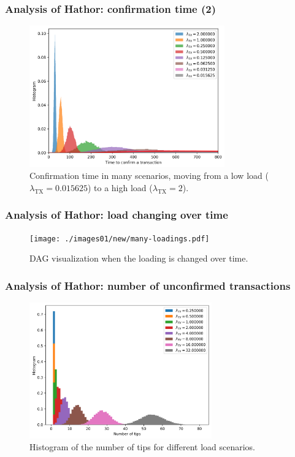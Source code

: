 \documentclass{beamer}
\begin{document}
\begin{frame}
\frametitle{Analysis of Hathor: confirmation time (2)}
\begin{figure}
\includegraphics[width=0.75\textwidth]{./images01/sim/tct-many-loads-2.png}

\caption{Confirmation time in many scenarios, moving from a low load ($\lambda_\text{TX} = 0.015625$) to a high load ($\lambda_\text{TX} = 2$). \label{fig:hathor-tct-many}}
\end{figure}
\end{frame}


\begin{frame}
\frametitle{Analysis of Hathor: load changing over time}
\begin{figure}
\centering
\texttt{[image: ./images01/new/many-loadings.pdf]}
\caption{DAG visualization when the loading is changed over time.}
\end{figure}
\end{frame}


\begin{frame}
\frametitle{Analysis of Hathor: number of unconfirmed transactions}
\begin{figure}
\includegraphics[width=0.7\textwidth]{./images01/new2/tips_aggregate.png}
\caption{Histogram of the number of tips for different load scenarios.}
\end{figure}
\end{frame}
\end{document}
